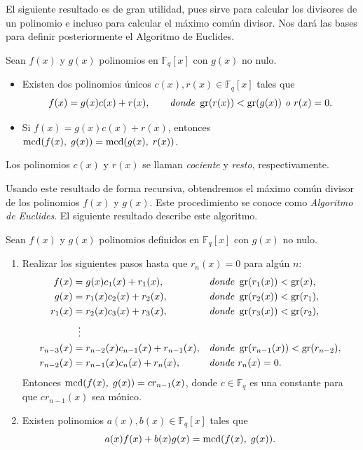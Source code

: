 El siguiente resultado es de gran utilidad, pues sirve para calcular los divisores de un polinomio e incluso para calcular el máximo común divisor. Nos dará las bases para definir posteriormente el Algoritmo de Euclides.

\begin{theorem}
    \label{th:div_alg}
    Sean $f(x)$ y $g(x)$ polinomios en $\mathbb{F}_q[x]$ con $g(x)$ no nulo.
    \begin{itemize}
        \item Existen dos polinomios únicos $c(x), r(x) \in \mathbb{F}_q[x]$ tales que
        \[
            f(x) = g(x) c(x) + r(x), \qquad \textit{donde } \operatorname{gr}(r(x)) < \operatorname{gr}(g(x)) \textit{ o } r(x) = 0.
        \]
        \item Si $f(x) = g(x) c(x) + r(x)$, entonces $\operatorname{mcd}(f(x), \; g(x)) = \operatorname{mcd}(g(x), \; r(x))$.
    \end{itemize}
\end{theorem}

Los polinomios $c(x)$ y $r(x)$ se llaman \emph{cociente} y \emph{resto}, respectivamente.

Usando este resultado de forma recursiva, obtendremos el máximo común divisor de los polinomios $f(x)$ y $g(x)$. Este procedimiento se conoce como \emph{Algoritmo de Euclides}. El siguiente resultado describe este algoritmo.

\begin{theorem}
    \label{th:alg-euclides}
    Sean $f(x)$ y $g(x)$ polinomios definidos en $\mathbb{F}_q[x]$ con $g(x)$ no nulo.
    \begin{enumerate}
        \item Realizar los siguientes pasos hasta que $r_n(x) = 0$ para algún $n$:
            \begin{align*}
                f(x)        &= g(x) c_1(x) + r_1(x), & &\textit{donde } \operatorname{gr}(r_1(x)) < \operatorname{gr}(x),\\
                g(x)        &= r_1(x) c_2(x) + r_2(x),& &\textit{donde } \operatorname{gr}(r_2(x)) < \operatorname{gr}(r_1),\\
                r_1(x)      &= r_2(x) c_3(x) + r_3(x),& &\textit{donde } \operatorname{gr}(r_3(x)) < \operatorname{gr}(r_2),\\
                            &\; \; \vdots & &\\
                r_{n-3}(x)  &= r_{n-2}(x) c_{n-1}(x) + r_{n-1}(x),& &\textit{donde } \operatorname{gr}(r_{n-1}(x)) < \operatorname{gr}(r_{n-2}),\\
                r_{n-2}(x)  &= r_{n-1}(x) c_{n}(x) + r_{n}(x),& &\textit{donde } r_n(x) = 0.
            \end{align*}
            Entonces $\operatorname{mcd}(f(x), \; g(x)) = cr_{n-1}(x)$, donde $c \in \mathbb{F}_q$ es una constante para que $c r_{n-1}(x)$ sea mónico.
        \item Existen polinomios $a(x), b(x) \in \mathbb{F}_q[x]$ tales que 
        $$a(x) f(x) + b(x) g(x) = \operatorname{mcd}(f(x), \; g(x)).$$
    \end{enumerate}
\end{theorem}

